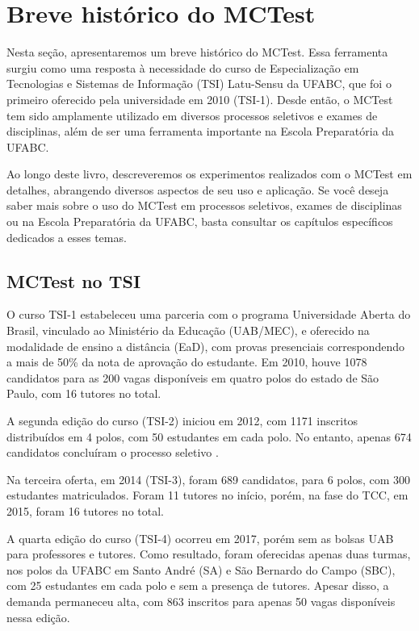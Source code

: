\section{Breve histórico do MCTest}\label{sec:historico}

Nesta seção, apresentaremos um breve histórico do MCTest. Essa ferramenta surgiu como uma resposta à necessidade do curso de Especialização em Tecnologias e Sistemas de Informação (TSI) Latu-Sensu da UFABC, que foi o primeiro oferecido pela universidade em 2010 (TSI-1). Desde então, o MCTest tem sido amplamente utilizado em diversos processos seletivos e exames de disciplinas, além de ser uma ferramenta importante na Escola Preparatória da UFABC.

Ao longo deste livro, descreveremos os experimentos realizados com o MCTest em detalhes, abrangendo diversos aspectos de seu uso e aplicação. Se você deseja saber mais sobre o uso do MCTest em processos seletivos, exames de disciplinas ou na Escola Preparatória da UFABC, basta consultar os capítulos específicos dedicados a esses temas.

\subsection{MCTest no TSI}

O curso TSI-1 estabeleceu uma parceria com o programa Universidade Aberta do Brasil, vinculado ao Ministério da Educação (UAB/MEC), e oferecido na modalidade de ensino a distância (EaD), com provas presenciais correspondendo a mais de 50\% da nota de aprovação do estudante. Em 2010, houve 1078 candidatos para as 200 vagas disponíveis em quatro polos do estado de São Paulo, com 16 tutores no total. 

A segunda edição do curso (TSI-2) iniciou em 2012, com 1171 inscritos distribuídos em 4 polos, com 50 estudantes em cada polo. No entanto, apenas 674 candidatos concluíram o processo seletivo \cite{2013:Zampirolli.Quilici-Gonzalez.ea}. 

Na terceira oferta, em 2014 (TSI-3), foram 689 candidatos, para 6 polos, com 300 estudantes matriculados. Foram 11 tutores no início, porém, na fase do TCC, em 2015, foram 16 tutores no total. 

A quarta edição do curso (TSI-4) ocorreu em 2017, porém sem as bolsas UAB para professores e tutores. Como resultado, foram oferecidas apenas duas turmas, nos polos da UFABC em Santo André (SA) e São Bernardo do Campo (SBC), com 25 estudantes em cada polo e sem a presença de tutores. Apesar disso, a demanda permaneceu alta, com 863 inscritos para apenas 50 vagas disponíveis nessa edição.

